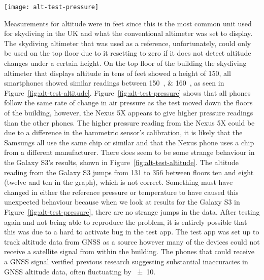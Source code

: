 

\begin{figure*}[ht]
  \centering
  \texttt{[image: alt-test-pressure]}
  \caption{Air pressure measurements from smartphones in Muirhead Tower}\label{fig:alt-test-pressure}
\end{figure*}

Measurements for altitude were in feet since this is the most common unit used for skydiving in the UK and what the conventional altimeter was set to display. The skydiving altimeter that was used as a reference, unfortunately, could only be used on the top floor due to it resetting to zero if it does not detect altitude changes under a certain height. On the top floor of the building the skydiving altimeter that displays altitude in tens of feet showed a height of \SI{150}{\feet}, all smartphones showed similar readings between \SIlist{150; 160}{\feet}, as seen in Figure~\ref{fig:alt-test-altitude}.
Figure~\ref{fig:alt-test-pressure} shows that all phones follow the same rate of change in air pressure as the test moved down the floors of the building, however, the Nexus 5X appears to give higher pressure readings than the other phones. The higher pressure reading from the Nexus 5X could be due to a difference in the barometric sensor's calibration, it is likely that the Samsungs all use the same chip or similar and that the Nexus phone uses a chip from a different manufacturer.
There does seem to be some strange behaviour in the Galaxy S3's results, shown in Figure~\ref{fig:alt-test-altitude}. The altitude reading from the Galaxy S3 jumps from \SI{131}{\feet} to \SI{356}{\feet} between floors ten and eight (twelve and ten in the graph), which is not correct. Something must have changed in either the reference pressure or temperature to have caused this unexpected behaviour because when we look at results for the Galaxy S3 in Figure~\ref{fig:alt-test-pressure}, there are no strange jumps in the data. After testing again and not being able to reproduce the problem, it is entirely possible that this was due to a hard to activate bug in the test app. The test app was set up to track altitude data from GNSS as a source however many of the devices could not receive a satellite signal from within the building. The phones that could receive a GNSS signal verified previous research suggesting substantial inaccuracies in GNSS altitude data, often fluctuating by \SI{\pm10}{\feet}.

